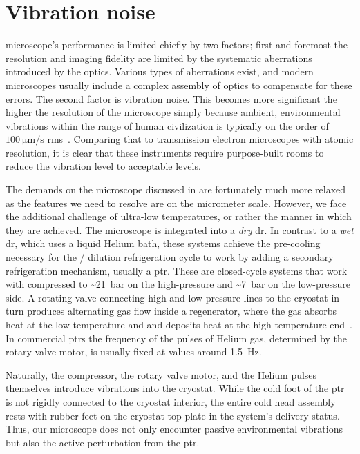 \chapter{Vibration noise}\label{ch:setup:vibrations}
 microscope's performance is limited chiefly by two factors; first and foremost the resolution and imaging fidelity are limited by the systematic aberrations introduced by the optics.
Various types of aberrations exist, and modern microscopes usually include a complex assembly of optics to compensate for these errors.
The second factor is vibration noise.
This becomes more significant the higher the resolution of the microscope simply because ambient, environmental vibrations within the range of human civilization is typically on the order of $\qty{100}{\micro\meter\per\second}$ \gls{rms}~\cite{Gordon1999}.
Comparing that to transmission electron microscopes with atomic resolution, it is clear that these instruments require purpose-built rooms to reduce the vibration level to acceptable levels.

The demands on the microscope discussed in \thethesis are fortunately much more relaxed as the features we need to resolve are on the micrometer scale.
However, we face the additional challenge of ultra-low temperatures, or rather the manner in which they are achieved.
The microscope is integrated into a \emph{dry} \gls{dr}.
In contrast to a \emph{wet} \gls{dr}, which uses a liquid Helium bath, these systems achieve the pre-cooling necessary for the / dilution refrigeration cycle to work by adding a secondary refrigeration mechanism, usually a \gls{ptr}.
These are closed-cycle systems that work with  compressed to \textasciitilde\qty{21}{\bar} on the high-pressure and \textasciitilde\qty{7}{\bar} on the low-pressure side.
A rotating valve connecting high and low pressure lines to the cryostat in turn produces alternating gas flow inside a regenerator, where the gas absorbs heat at the low-temperature and and deposits heat at the high-temperature end~\cite{Radebaugh2009,DeWaele2011}.
In commercial \glspl{ptr} the frequency of the pulses of Helium gas, determined by the rotary valve motor, is usually fixed at values around \qty{1.5}{\hertz}.

Naturally, the compressor, the rotary valve motor, and the Helium pulses themselves introduce vibrations into the cryostat.
While the cold foot of the \gls{ptr} is not rigidly connected to the cryostat interior,
the entire cold head assembly rests with rubber feet on the cryostat top plate in the system's delivery status.
Thus, our microscope does not only encounter passive environmental vibrations but also the active perturbation from the \gls{ptr}.

